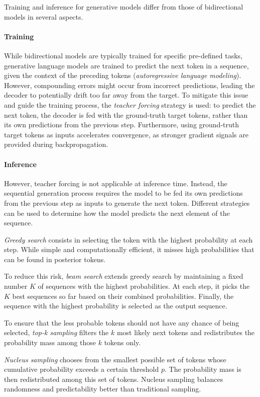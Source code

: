 Training and inference for generative models differ from those of bidirectional models in several aspects.

\paragraph{Training} While bidirectional models are typically trained for specific pre-defined tasks, generative language models are trained to predict the next token in a sequence, given the context of the preceding tokens (\textit{autoregressive language modeling}). However, compounding errors might occur from incorrect predictions, leading the decoder to potentially drift too far away from the target. To mitigate this issue and guide the training process, the \textit{teacher forcing} strategy is used: to predict the next token, the decoder is fed with the ground-truth target tokens, rather than its own predictions from the previous step. Furthermore, using ground-truth target tokens as inputs accelerates convergence, as stronger gradient signals are provided during backpropagation.

\paragraph{Inference} However, teacher forcing is not applicable at inference time. Instead, the sequential generation process requires the model to be fed its own predictions from the previous step as inputs to generate the next token. Different strategies can be used to determine how the model predicts the next element of the sequence. 

\textit{Greedy search} consists in selecting the token with the highest probability at each step. While simple and computationally efficient, it misses high probabilities that can be found in posterior tokens. 

To reduce this risk, \textit{beam search} extends greedy search by maintaining a fixed number $K$  of sequences with the highest probabilities. At each step, it picks the $K$ best sequences so far based on their combined probabilities. Finally, the sequence with the highest probability is selected as the output sequence.

To ensure that the less probable tokens should not have any chance of being selected, \textit{top-k sampling} \citep{fan2018hierarchical} filters the $k$ most likely next tokens and redistributes the probability mass among those $k$ tokens only. 

\textit{Nucleus sampling} chooses from the smallest possible set of tokens whose
cumulative probability exceeds a certain threshold $p$. The probability mass
is then redistributed among this set of tokens. Nucleus sampling balances randomness and predictability better than traditional sampling.

